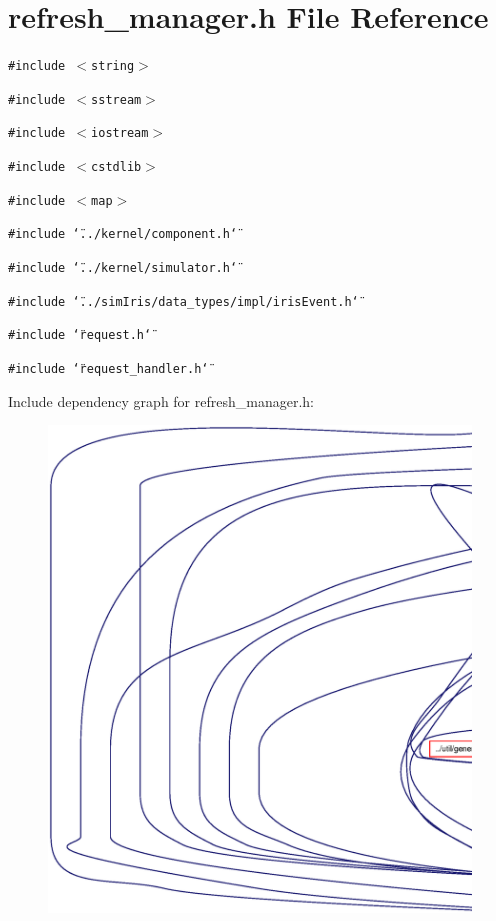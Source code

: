 \section{refresh\_\-manager.h File Reference}
\label{refresh__manager_8h}
{\tt \#include $<$string$>$}\par
{\tt \#include $<$sstream$>$}\par
{\tt \#include $<$iostream$>$}\par
{\tt \#include $<$cstdlib$>$}\par
{\tt \#include $<$map$>$}\par
{\tt \#include \char`\"{}../kernel/component.h\char`\"{}}\par
{\tt \#include \char`\"{}../kernel/simulator.h\char`\"{}}\par
{\tt \#include \char`\"{}../simIris/data\_\-types/impl/irisEvent.h\char`\"{}}\par
{\tt \#include \char`\"{}request.h\char`\"{}}\par
{\tt \#include \char`\"{}request\_\-handler.h\char`\"{}}\par


Include dependency graph for refresh\_\-manager.h:\nopagebreak
\begin{figure}[H]
\begin{center}
\leavevmode
\includegraphics[width=420pt]{refresh__manager_8h__incl}
\end{center}
\end{figure}


